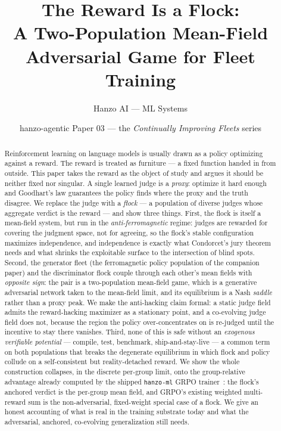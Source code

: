 \documentclass[11pt]{article}
\title{\textbf{The Reward Is a Flock:\\ A Two-Population Mean-Field Adversarial Game for Fleet Training}}
\author{Hanzo AI --- ML Systems}
\date{hanzo-agentic Paper 03 --- the \emph{Continually Improving Fleets} series}
\theoremstyle{definition}
\theoremstyle{remark}
\begin{document}
\maketitle

\begin{abstract}
Reinforcement learning on language models is usually drawn as a policy optimizing against a reward. The
reward is treated as furniture --- a fixed function handed in from outside. This paper takes the reward as
the object of study and argues it should be neither fixed nor singular. A single learned judge is a
\emph{proxy}: optimize it hard enough and Goodhart's law guarantees the policy finds where the proxy and
the truth disagree. We replace the judge with a \emph{flock} --- a population of diverse judges whose
aggregate verdict is the reward --- and show three things. First, the flock is itself a mean-field system,
but run in the \emph{anti-ferromagnetic} regime: judges are rewarded for covering the judgment space, not
for agreeing, so the flock's stable configuration maximizes independence, and independence is exactly what
Condorcet's jury theorem needs and what shrinks the exploitable surface to the intersection of blind spots.
Second, the generator fleet (the ferromagnetic policy population of the companion paper) and the
discriminator flock couple through each other's mean fields with \emph{opposite sign}: the pair is a
two-population mean-field game, which is a generative adversarial network taken to the mean-field limit,
and its equilibrium is a Nash \emph{saddle} rather than a proxy peak. We make the anti-hacking claim
formal: a static judge field admits the reward-hacking maximizer as a stationary point, and a co-evolving
judge field does not, because the region the policy over-concentrates on is re-judged until the incentive
to stay there vanishes. Third, none of this is safe without an \emph{exogenous verifiable potential} ---
compile, test, benchmark, ship-and-stay-live --- a common term on both populations that breaks the
degenerate equilibrium in which flock and policy collude on a self-consistent but reality-detached reward.
We show the whole construction collapses, in the discrete per-group limit, onto the group-relative
advantage already computed by the shipped \texttt{hanzo-ml} GRPO trainer~\cite{shao2024grpo}: the flock's
anchored verdict is the per-group mean field, and GRPO's existing weighted multi-reward sum is the
non-adversarial, fixed-weight special case of a flock. We give an honest accounting of what is real in the
training substrate today and what the adversarial, anchored, co-evolving generalization still needs.
\end{abstract}
\end{document}
